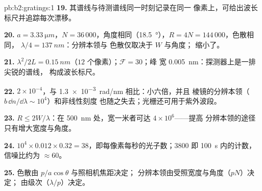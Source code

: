 \begin{solution}{pb:b2:gratings:1}
\textbf{19.} 其谱线与待测谱线同一时刻记录在同一
像素上，可给出波长标尺并追踪每次漂移。

\textbf{20.} $a = \qty{3.33}{\micro m}$，$N = 36\,000$，角度相同（\qty{18.5}{\degree}），$R = 4N
= 144\,000$，色散相同， $\lambda/4 = \qty{137}{nm}$：分辨本领与
色散仅取决于 $W$ 与角度；
缩小了。

\textbf{21.}  $\lambda^2/2L = \qty{0.15}{nm}$（$12$ 个像素）；$\mathcal F = 30$；峰
宽 \qty{0.005}{nm}：探测器上是一排尖锐的谱线，
构成波长标尺。

\textbf{22.} $2 \times 10^{-4}$，与 \qty{1.3e-3}{rad/nm} 相比：小六倍，并且
棱镜的分辨本领（$b\,\dd n/\dd\lambda \sim 10^4$）和非线性刻度
也随之失去；光栅还可用于紫外波段。

\textbf{23.} $R \le 2W/\lambda$：在 \qty{500}{nm} 处，宽一米者可达 $4 \times 10^6$——提高
分辨本领的途径只有增大宽度与角度。

\textbf{24.} $10^4 \times 0.012 \times 0.32 = 38$，即每像素每秒的光子数；$3800$
即 \qty{100}{s} 内的计数，信噪比约为 $\approx 60$。

\textbf{25.} 色散由 $p/a\cos\theta$ 与照相机焦距决定；
分辨本领由受照宽度与角度（$pN$）决定；
由级次（$\lambda/p$）决定。
\end{solution}
